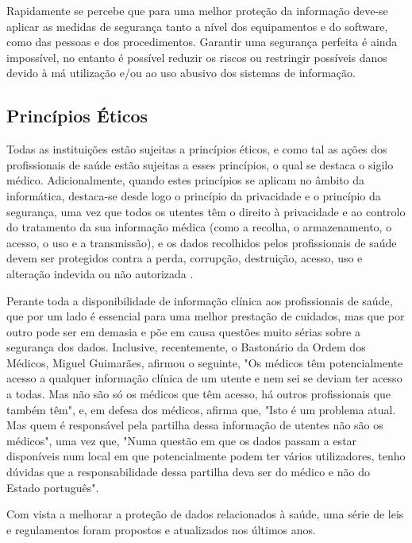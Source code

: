 \documentclass[conference]{IEEEtran}
\begin{document}
Rapidamente se percebe que para uma melhor proteção da informação deve-se aplicar as medidas de segurança tanto a nível dos equipamentos e do software, como das pessoas e dos procedimentos. Garantir uma segurança perfeita é ainda impossível, no entanto é possível reduzir os riscos ou restringir possíveis danos devido à má utilização e/ou ao uso abusivo dos sistemas de informação.


\subsection{Princípios Éticos} \label{princ_eticos}

Todas as instituições estão sujeitas a princípios éticos, e como tal as ações dos profissionais de saúde estão sujeitas a esses princípios, o qual se destaca o sigilo médico. Adicionalmente, quando estes princípios se aplicam no âmbito da informática, destaca-se desde logo o princípio da privacidade e o princípio da segurança, uma vez que todos os utentes têm o direito à privacidade e ao controlo do tratamento da sua informação médica (como a recolha, o armazenamento, o acesso, o uso e a transmissão), e os dados recolhidos pelos profissionais de saúde devem ser protegidos contra a perda, corrupção, destruição, acesso, uso e alteração indevida ou não autorizada \cite{segurancaSI}.

Perante toda a disponibilidade de informação clínica aos profissionais de saúde, que por um lado é essencial para uma melhor prestação de cuidados, mas que por outro pode ser em demasia e põe em causa questões muito sérias sobre a segurança dos dados. Inclusive, recentemente, o Bastonário da Ordem dos Médicos, Miguel Guimarães, afirmou o seguinte, "Os médicos têm potencialmente acesso a qualquer informação clínica de um utente e nem sei se deviam ter acesso a todas. Mas não são só os médicos que têm acesso, há outros profissionais que também têm", e, em defesa dos médicos, afirma que, "Isto é um problema atual. Mas quem é responsável pela partilha dessa informação de utentes não são os médicos", uma vez que, "Numa questão em que os dados passam a estar disponíveis num local em que potencialmente podem ter vários utilizadores, tenho dúvidas que a responsabilidade dessa partilha deva ser do médico e não do Estado português".

Com vista a melhorar a proteção de dados relacionados à saúde, uma série de leis e regulamentos foram propostos e atualizados nos últimos anos.
\end{document}

